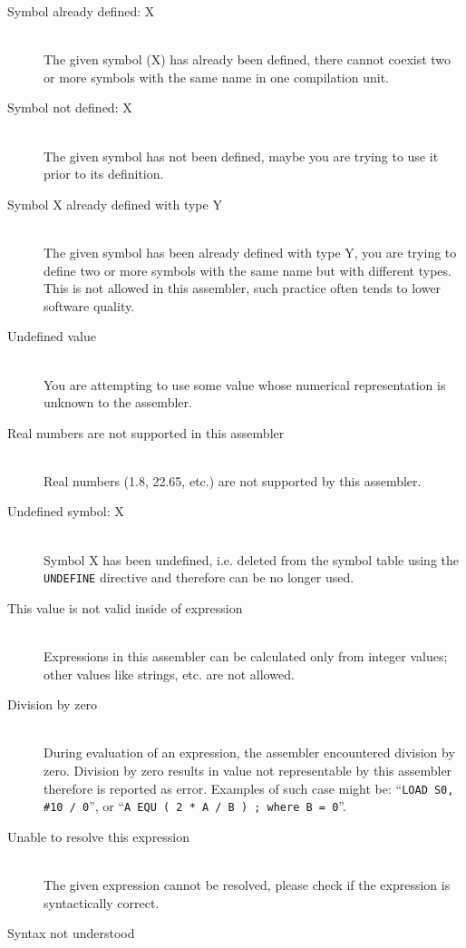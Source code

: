 \begin{description}
        \item[Symbol already defined: X]~\\
            The given symbol (X) has already been defined, there cannot coexist two or more symbols with the same name in one compilation unit.
        \item[Symbol not defined: X]~\\
            The given symbol has not been defined, maybe you are trying to use it prior to its definition.
        \item[Symbol X already defined with type Y]~\\
            The given symbol has been already defined with type Y, you are trying to define two or more symbols with the same name but with different types. This is not allowed in this assembler, such practice often tends to lower software quality.
        \item[Undefined value]~\\
            You are attempting to use some value whose numerical representation is unknown to the assembler.
        \item[Real numbers are not supported in this assembler]~\\
            Real numbers (1.8, 22.65, etc.) are not supported by this assembler.
        \item[Undefined symbol: X]~\\
            Symbol X has been undefined, i.e. deleted from the symbol table using the \texttt{UNDEFINE} directive and therefore can be no longer used.
        \item[This value is not valid inside of expression ]~\\
            Expressions in this assembler can be calculated only from integer values; other values like strings, etc. are not allowed.
        \item[Division by zero]~\\
            During evaluation of an expression, the assembler encountered division by zero. Division by zero results in value not representable by this assembler therefore is reported as error. Examples of such case might be: ``\texttt{LOAD S0, \#10 / 0}'', or ``\texttt{A  EQU  ( 2 * A / B ) ; where B = 0}''.
        \item[Unable to resolve this expression]~\\
            The given expression cannot be resolved, please check if the expression is syntactically correct.
        \item[Syntax not understood]~\\

\end{description}
